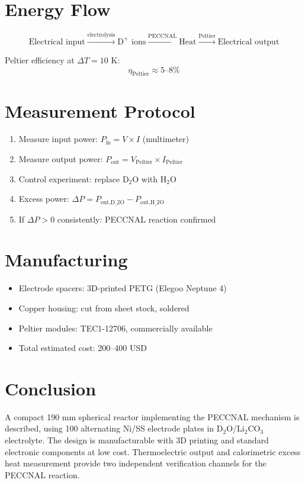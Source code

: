 \documentclass[12pt,a4paper]{article}
\begin{document}
\section{Energy Flow}

\begin{equation}
\text{Electrical input} \xrightarrow{\text{electrolysis}}
\text{D}^+ \text{ ions} \xrightarrow{\text{PECCNAL}}
\text{Heat} \xrightarrow{\text{Peltier}}
\text{Electrical output}
\end{equation}

Peltier efficiency at $\Delta T = 10$ K:
\begin{equation}
\eta_\text{Peltier} \approx 5\text{--}8\%
\end{equation}

\section{Measurement Protocol}

\begin{enumerate}
\item Measure input power: $P_\text{in} = V \times I$ (multimeter)
\item Measure output power: $P_\text{out} = V_\text{Peltier} \times I_\text{Peltier}$
\item Control experiment: replace D$_2$O with H$_2$O
\item Excess power: $\Delta P = P_\text{out,D_2O} - P_\text{out,H_2O}$
\item If $\Delta P > 0$ consistently: PECCNAL reaction confirmed
\end{enumerate}

\section{Manufacturing}

\begin{itemize}
\item Electrode spacers: 3D-printed PETG (Elegoo Neptune 4)
\item Copper housing: cut from sheet stock, soldered
\item Peltier modules: TEC1-12706, commercially available
\item Total estimated cost: 200--400 USD
\end{itemize}

\section{Conclusion}
A compact 190 mm spherical reactor implementing the PECCNAL
mechanism is described, using 100 alternating Ni/SS electrode
plates in D$_2$O/Li$_2$CO$_3$ electrolyte. The design is
manufacturable with 3D printing and standard electronic
components at low cost. Thermoelectric output and calorimetric
excess heat measurement provide two independent verification
channels for the PECCNAL reaction.
\end{document}
